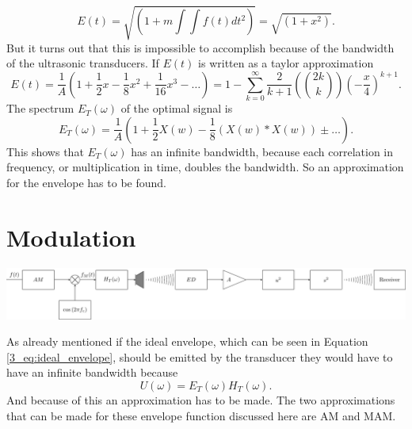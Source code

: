 \begin{equation}
    E(t) = \sqrt{\left ( 1 + m \int \int f(t)dt^2 \right )} =  \sqrt{\left ( 1 +x^2 \right )}.
\end{equation}
But it turns out that this is  impossible to accomplish because of the bandwidth of the ultrasonic transducers.
If $E(t)$ is written as a taylor approximation
\begin{equation}\label{3_eq:ideal_envelope}
    E(t) 
    = 
    \frac{1}{A} \left ( 1 + \frac{1}{2}x - \frac{1}{8}x^2 + \frac{1}{16}x^3 - \dots \right ) 
    =
    1 - \sum_{k=0}^\infty \frac{2}{k+1} \left ( \binom{2k}{k} \right) \left ( -\frac{x}{4}\right )^{k+1}.
\end{equation}
The spectrum $E_T(\omega)$ of the optimal signal is
\begin{equation}
    E_T(\omega) = \frac{1}{A} \left ( 1 + \frac{1}{2}X(w) - \frac{1}{8}\left (X(w) * X(w)\right ) \pm \dots \right ).
\end{equation}
This shows that $E_T(\omega)$ has an infinite bandwidth, because each correlation in frequency, or multiplication in time, doubles the bandwidth.
So an approximation for the envelope has to be found.
\section{Modulation}\label{3_Parametric_array_Sec:Modulation}
\begin{center}
    \includegraphics[width=\textwidth]{images/3_Parametric_array/Block_Diagram_Modulation.pdf}
\end{center}
As already mentioned if the ideal envelope, which can be seen in Equation \ref{3_eq:ideal_envelope}, should be emitted by the transducer they would have to have an infinite bandwidth because 
\begin{equation}
    U(\omega) = E_T(\omega) H_T(\omega).
\end{equation}
And because of this an approximation has to be made.
The two approximations that can be made for these envelope function discussed here are AM and MAM. 
